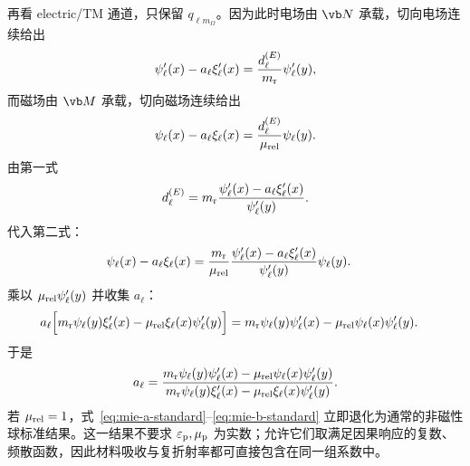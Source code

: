 再看 electric/TM 通道，只保留 $q_{\ell m_{\Omega}}$。因为此时电场由
$\vb N$ 承载，切向电场连续给出
\begin{equation}
\psi_\ell'(x)-a_\ell\xi_\ell'(x)
=\frac{d_\ell^{(E)}}{m_{\rm r}}
\psi_\ell'(y),
\label{eq:mie-E-bc-E}
\end{equation}
而磁场由 $\vb M$ 承载，切向磁场连续给出
\begin{equation}
\psi_\ell(x)-a_\ell\xi_\ell(x)
=\frac{d_\ell^{(E)}}{\mu_{\rm rel}}
\psi_\ell(y).
\label{eq:mie-E-bc-H}
\end{equation}
由第一式
\begin{equation}
d_\ell^{(E)}
=m_{\rm r}
\frac{\psi_\ell'(x)-a_\ell\xi_\ell'(x)}
{\psi_\ell'(y)}.
\end{equation}
代入第二式：
\begin{align}
\psi_\ell(x)-a_\ell\xi_\ell(x)
&=\frac{m_{\rm r}}{\mu_{\rm rel}}
\frac{\psi_\ell'(x)-a_\ell\xi_\ell'(x)}
{\psi_\ell'(y)}\psi_\ell(y).
\end{align}
乘以 $\mu_{\rm rel}\psi_\ell'(y)$ 并收集 $a_\ell$：
\begin{align}
a_\ell\Bigl[
 m_{\rm r}\psi_\ell(y)\xi_\ell'(x)
-\mu_{\rm rel}\xi_\ell(x)\psi_\ell'(y)
\Bigr]
={}&
 m_{\rm r}\psi_\ell(y)\psi_\ell'(x)
-\mu_{\rm rel}\psi_\ell(x)\psi_\ell'(y).
\end{align}
于是
\begin{equation}
{
a_\ell=
\frac{
 m_{\rm r}\psi_\ell(y)\psi_\ell'(x)
-\mu_{\rm rel}\psi_\ell(x)\psi_\ell'(y)
}{
 m_{\rm r}\psi_\ell(y)\xi_\ell'(x)
-\mu_{\rm rel}\xi_\ell(x)\psi_\ell'(y)
}.}
\label{eq:mie-a-standard}
\end{equation}
若 $\mu_{\rm rel}=1$，式~\cref{eq:mie-a-standard}--\cref{eq:mie-b-standard} 立即退化为通常的非磁性球标准结果。这一结果不要求
$\varepsilon_{\rm p},\mu_{\rm p}$ 为实数；允许它们取满足因果响应的复数、频散函数，因此材料吸收与复折射率都可直接包含在同一组系数中。


